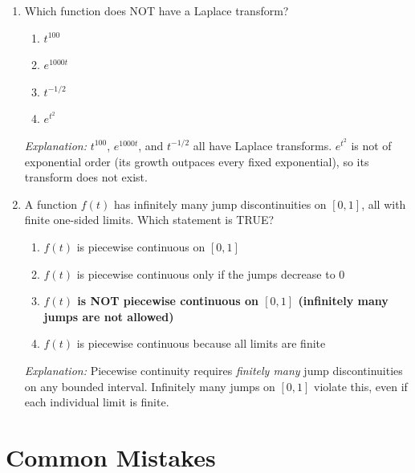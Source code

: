 \documentclass[12pt,a4paper]{article}
\begin{document}
\begin{enumerate}[label=\textbf{MCQ \arabic*.}]
\item Which function does NOT have a Laplace transform?
\begin{enumerate}[label=(\alph*)]
  \item $t^{100}$
  \item $e^{1000t}$
  \item $t^{-1/2}$
  \item \textbf{$e^{t^2}$}
\end{enumerate}
\textit{Explanation:} $t^{100}$, $e^{1000t}$, and $t^{-1/2}$ all have Laplace transforms.
$e^{t^2}$ is not of exponential order (its growth outpaces every fixed exponential), so its
transform does not exist.

\item A function $f(t)$ has infinitely many jump discontinuities on $[0, 1]$, all with finite
one-sided limits. Which statement is TRUE?
\begin{enumerate}[label=(\alph*)]
  \item $f(t)$ is piecewise continuous on $[0,1]$
  \item $f(t)$ is piecewise continuous only if the jumps decrease to 0
  \item \textbf{$f(t)$ is NOT piecewise continuous on $[0,1]$ (infinitely many jumps are not allowed)}
  \item $f(t)$ is piecewise continuous because all limits are finite
\end{enumerate}
\textit{Explanation:} Piecewise continuity requires \emph{finitely many} jump discontinuities
on any bounded interval. Infinitely many jumps on $[0,1]$ violate this, even if each individual
limit is finite.

\end{enumerate}

\section{Common Mistakes}
\end{document}
